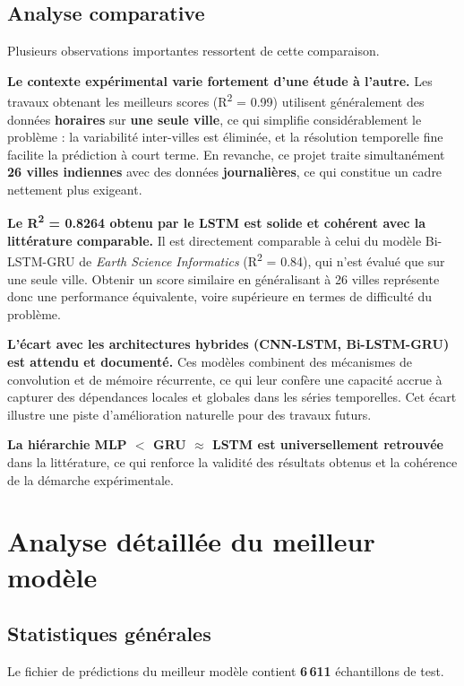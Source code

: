 \documentclass[11pt,a4paper]{article}
\begin{document}
\subsection{Analyse comparative}

Plusieurs observations importantes ressortent de cette comparaison.

\textbf{Le contexte expérimental varie fortement d'une étude à l'autre.} Les travaux obtenant les meilleurs scores (R\textsuperscript{2} = 0.99) utilisent généralement des données \textbf{horaires} sur \textbf{une seule ville}, ce qui simplifie considérablement le problème : la variabilité inter-villes est éliminée, et la résolution temporelle fine facilite la prédiction à court terme. En revanche, ce projet traite simultanément \textbf{26 villes indiennes} avec des données \textbf{journalières}, ce qui constitue un cadre nettement plus exigeant.

\textbf{Le R\textsuperscript{2} = 0.8264 obtenu par le LSTM est solide et cohérent avec la littérature comparable.} Il est directement comparable à celui du modèle Bi-LSTM-GRU de \textit{Earth Science Informatics} (R\textsuperscript{2} = 0.84), qui n'est évalué que sur une seule ville. Obtenir un score similaire en généralisant à 26 villes représente donc une performance équivalente, voire supérieure en termes de difficulté du problème.

\textbf{L'écart avec les architectures hybrides (CNN-LSTM, Bi-LSTM-GRU) est attendu et documenté.} Ces modèles combinent des mécanismes de convolution et de mémoire récurrente, ce qui leur confère une capacité accrue à capturer des dépendances locales et globales dans les séries temporelles. Cet écart illustre une piste d'amélioration naturelle pour des travaux futurs.

\textbf{La hiérarchie MLP $<$ GRU $\approx$ LSTM est universellement retrouvée} dans la littérature, ce qui renforce la validité des résultats obtenus et la cohérence de la démarche expérimentale.

\section{Analyse détaillée du meilleur modèle}

\subsection{Statistiques générales}
Le fichier de prédictions du meilleur modèle contient \textbf{6\,611} échantillons de test.
\end{document}
